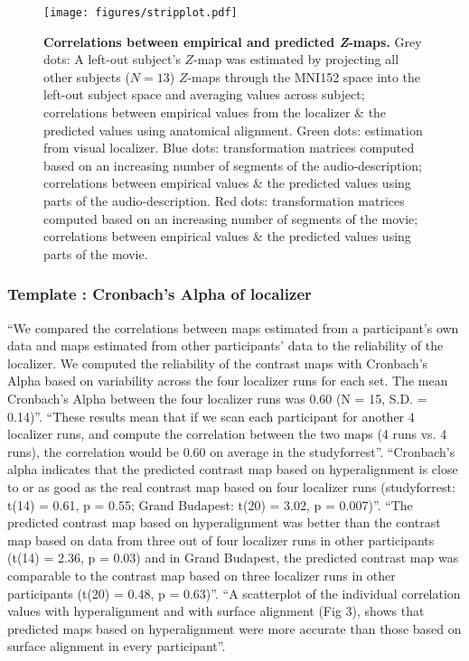 \begin{figure*}[tbp] \centering
    \texttt{[image: figures/stripplot.pdf]} \caption{
    \textbf{Correlations between empirical and predicted
    \textit{\textbf{Z}}-maps.}
    Grey dots: A left-out subject's $Z$-map was estimated by projecting all
    other subjects ($N = 13$) $Z$-maps through the MNI152 space into the
    left-out subject space and averaging values across subject; correlations
    between empirical values from the localizer \& the predicted values using
    anatomical alignment.
    Green dots: estimation from visual localizer.
    Blue dots: transformation matrices computed based on an increasing number of
    segments of the audio-description; correlations between empirical values \&
    the predicted values using parts of the audio-description.
    Red dots: transformation matrices computed based on an increasing number of
    segments of the movie; correlations between empirical values \& the
    predicted values using parts of the movie.
}
\label{fig:stripplot}
\end{figure*}


\subsubsection{Template \citet{jiahui2020predicting}: Cronbach's Alpha of localizer}

%
``We compared the correlations between maps estimated from a participant's own
data and maps estimated from other participants' data to the reliability of the
localizer. We computed the reliability of the contrast maps with Cronbach's
Alpha based on variability across the four localizer runs for each set. The mean
Cronbach's Alpha between the four localizer runs was 0.60 (N = 15, S.D. =
0.14)''.
%
``These results mean that if we scan each participant for another 4 localizer
runs, and compute the correlation between the two maps (4 runs vs. 4 runs), the
correlation would be 0.60 on average in the studyforrest''.
%
``Cronbach's alpha indicates that the predicted contrast map based on
hyperalignment is close to or as good as the real contrast map based on four
localizer runs (studyforrest: t(14) = 0.61, p = 0.55; Grand Budapest: t(20) =
3.02, p = 0.007)''.
%
``The predicted contrast map based on hyperalignment was better than the
contrast map based on data from three out of four localizer runs in other
participants (t(14) = 2.36, p = 0.03) and in Grand Budapest, the predicted
contrast map was comparable to the contrast map based on three localizer runs in
other participants (t(20) = 0.48, p = 0.63)''.
%
``A scatterplot of the individual correlation values with hyperalignment and
with surface alignment (Fig 3), shows that predicted maps based on
hyperalignment were more accurate than those based on surface alignment in every
participant''.


